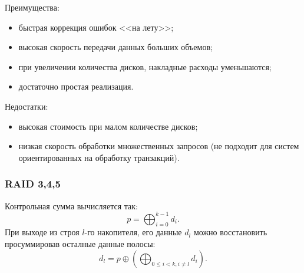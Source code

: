 Преимущества:
\begin{itemize}
    \item быстрая коррекция ошибок <<на лету>>;
    \item высокая скорость передачи данных больших объемов;
    \item при увеличении количества дисков, накладные расходы уменьшаются;
    \item достаточно простая реализация. 
\end{itemize}

Недостатки:
\begin{itemize}
    \item высокая стоимость при малом количестве дисков;
    \item низкая скорость обработки множественных запросов (не подходит для систем ориентированных на обработку транзакций).
\end{itemize}


\begin{frame}
    \frametitle{RAID 3,4,5}
    
    Контрольная сумма вычисляется так:
    \[p=\bigoplus_{i=0}^{k-1}d_i.\]
    При выходе из строя $l$-го накопителя, его данные $d_l$ можно восстановить просуммировав осталные данные полосы: 
    \[d_l=p\oplus\left(\bigoplus_{0\leq i< k, i\neq l}d_i\right).\]
\end{frame}


